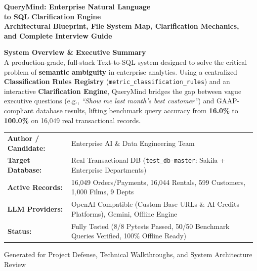 \documentclass[10pt,a4paper]{article}
\begin{document}
\begin{titlepage}
    \centering
    \vspace*{1.5cm}
    
    {\Huge\bfseries\color{brandnavy} QueryMind: Enterprise Natural Language\\to SQL Clarification Engine}\\[0.6cm]
    {\Large\bfseries\color{brandblue} Architectural Blueprint, File System Map, Clarification Mechanics, and Complete Interview Guide}\\[1.5cm]
    
    \begin{tcolorbox}[colback=boxbg,colframe=brandnavy,arc=4mm,boxrule=1pt,width=0.92\textwidth]
        \centering\vspace{0.3cm}
        \textbf{\large System Overview \& Executive Summary}\\[0.3cm]
        \normalsize
        \textcolor{brandnavy}{A production-grade, full-stack Text-to-SQL system designed to solve the critical problem of \textbf{semantic ambiguity} in enterprise analytics. Using a centralized \textbf{Classification Rules Registry} (\texttt{metric\_classification\_rules}) and an interactive \textbf{Clarification Engine}, QueryMind bridges the gap between vague executive questions (e.g., \textit{``Show me last month's best customer''}) and GAAP-compliant database results, lifting benchmark query accuracy from \textbf{16.0\%} to \textbf{100.0\%} on 16,049 real transactional records.}
        \vspace{0.3cm}
    \end{tcolorbox}
    
    \vspace{1.5cm}
    
    \begin{tabular}{ll}
        \textbf{Author / Candidate:} & Enterprise AI \& Data Engineering Team \\
        \textbf{Target Database:} & Real Transactional DB (\texttt{test\_db-master}: Sakila + Enterprise Departments) \\
        \textbf{Active Records:} & 16,049 Orders/Payments, 16,044 Rentals, 599 Customers, 1,000 Films, 9 Depts \\
        \textbf{LLM Providers:} & OpenAI Compatible (Custom Base URLs \& AI Credits Platforms), Gemini, Offline Engine \\
        \textbf{Status:} & Fully Tested (8/8 Pytests Passed, 50/50 Benchmark Queries Verified, 100\% Offline Ready) \\
    \end{tabular}
    
    \vfill
    {\footnotesize\color{gray} Generated for Project Defense, Technical Walkthroughs, and System Architecture Review}
\end{titlepage}
\end{document}
